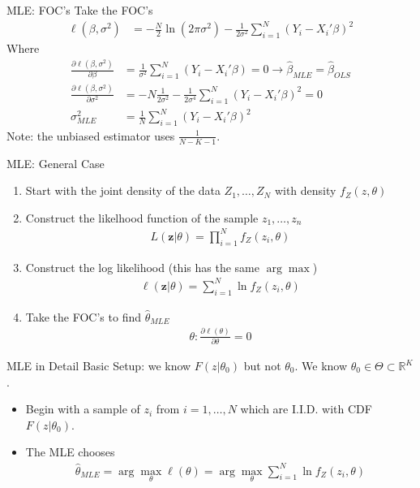 \documentclass[aspectratio=169]{beamer}
\begin{document}
\begin{frame}{MLE: FOC's}
Take the FOC's
\begin{align*}
\ell(\beta,\sigma^2) &= -\frac{N}{2} \ln (2 \pi \sigma^2) - \frac{1}{2 \sigma^2} \sum_{i=1}^N(Y_i - X_i' \beta)^2
\end{align*}
Where 
\begin{align*} 
\frac{ \partial \ell(\beta,\sigma^2) }{\partial \beta}&= \frac{1}{ \sigma^2}\sum_{i=1}^N(Y_i - X_i' \beta) = 0 \rightarrow \widehat{\beta}_{MLE}= \widehat{\beta}_{OLS}\\ 
\frac{ \partial \ell(\beta,\sigma^2) }{\partial \sigma^2}&= -N \frac{1}{2 \sigma^2}  -  \frac{1}{2 \sigma^4} \sum_{i=1}^N(Y_i - X_i' \beta)^2 = 0 \\
\sigma^2_{MLE} &= \frac{1}{N} \sum_{i=1}^N (Y_i - X_i' \beta)^2
\end{align*}
Note: the unbiased estimator uses $\frac{1}{N-K-1}$.
\end{frame}

\begin{frame}{MLE: General Case}
\begin{enumerate}
\item Start with the \alert{joint density of the data} $Z_1,\ldots,Z_N$ with density $f_Z(z,\theta)$
\item Construct the likelhood function of the sample $z_1,\ldots,z_n$
\begin{align*}
L(\mathbf{z} | \theta) = \prod_{i=1}^N f_Z(z_i,\theta)
\end{align*}
\item Construct the \alert{log likelihood} (this has the same $\arg \max$)
\begin{align*}
\ell(\mathbf{z} | \theta) = \sum_{i=1}^N \ln f_Z(z_i,\theta)
\end{align*}
\item Take the FOC's to find $\widehat{\theta}_{MLE}$
\begin{align*}
\theta : \frac{\partial \ell(\theta)}{\partial \theta} =0
\end{align*}
\end{enumerate}
\end{frame}

\begin{frame}{MLE in Detail}
Basic Setup: we know $F(z|\theta_0)$ but not $\theta_0$. We know $\theta_0 \in \Theta \subset \mathbb{R}^K$.
\begin{itemize}
\item Begin with a sample of $z_i$ from $i=1,\ldots,N$ which are I.I.D. with CDF $F(z|\theta_0)$.
\item The MLE chooses
\begin{align*}
\widehat{\theta}_{MLE} = \arg \max_{\theta} \ell(\theta) = \arg \max_{\theta} \sum_{i=1}^N \ln f_Z(z_i,\theta)
\end{align*}
\end{itemize}
\end{frame}
\end{document}
